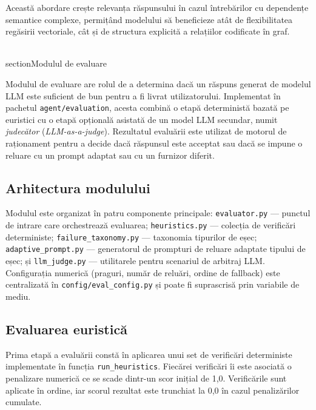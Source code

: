 \documentclass[12pt, a4paper, oneside, romanian]{teza-upb}
\begin{document}
Această abordare crește relevanța răspunsului în cazul întrebărilor cu dependențe semantice complexe, permițând modelului să beneficieze atât de flexibilitatea regăsirii vectoriale, cât și de structura explicită a relațiilor codificate în graf.

\\section{Modulul de evaluare}
\label{sec:evaluare}

Modulul de evaluare are rolul de a determina dacă un răspuns generat de modelul LLM este suficient de bun pentru a fi livrat utilizatorului. Implementat în pachetul \texttt{agent/evaluation}, acesta combină o etapă deterministă bazată pe euristici cu o etapă opțională asistată de un model LLM secundar, numit \textit{judecător} (\textit{LLM-as-a-judge}). Rezultatul evaluării este utilizat de motorul de raționament pentru a decide dacă răspunsul este acceptat sau dacă se impune o reluare cu un prompt adaptat sau cu un furnizor diferit.

\subsection{Arhitectura modulului}

Modulul este organizat în patru componente principale: \texttt{evaluator.py} — punctul de intrare care orchestrează evaluarea; \texttt{heuristics.py} — colecția de verificări deterministe; \texttt{failure\_taxonomy.py} — taxonomia tipurilor de eșec; \texttt{adaptive\_prompt.py} — generatorul de prompturi de reluare adaptate tipului de eșec; și \texttt{llm\_judge.py} — utilitarele pentru scenariul de arbitraj LLM. Configurația numerică (praguri, număr de reluări, ordine de fallback) este centralizată în \texttt{config/eval\_config.py} și poate fi suprascrisă prin variabile de mediu.

\subsection{Evaluarea euristică}

Prima etapă a evaluării constă în aplicarea unui set de verificări deterministe implementate în funcția \texttt{run\_heuristics}. Fiecărei verificări îi este asociată o penalizare numerică ce se scade dintr-un scor inițial de 1,0. Verificările sunt aplicate în ordine, iar scorul rezultat este trunchiat la 0,0 în cazul penalizărilor cumulate.
\end{document}
